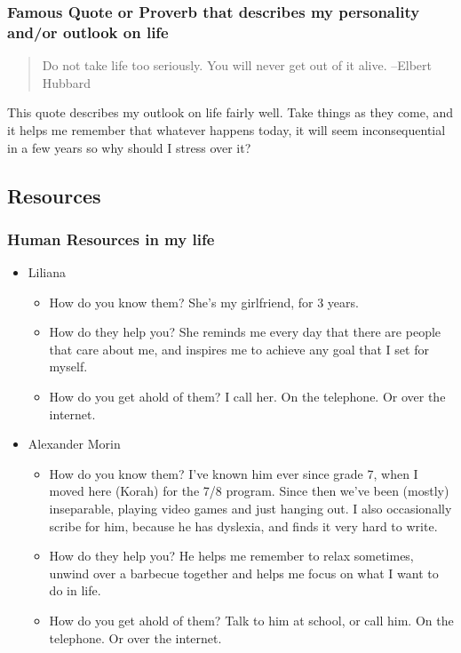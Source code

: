 \documentclass[11pt]{article}
\begin{document}
\subsubsection*{Famous Quote or Proverb that describes my personality and/or outlook on life}
\label{sec:org5235c1a}
\begin{quote}
Do not take life too seriously. You will never get out of it alive. --Elbert Hubbard
\end{quote}
This quote describes my outlook on life fairly well. Take things as they come, and it helps me remember that whatever happens today, it will seem inconsequential in a few years so why should I stress over it?
\subsection*{Resources}
\label{sec:org646a368}
\subsubsection*{Human Resources in my life}
\label{sec:org1f25e0e}
\begin{itemize}
\item Liliana
\label{sec:org3214a1a}
\begin{itemize}
\item How do you know them?
\label{sec:org307dc32}
She's my girlfriend, for 3 years.
\item How do they help you?
\label{sec:org05a9ec2}
She reminds me every day that there are people that care about me, and inspires me to achieve any goal that I set for myself.
\item How do you get ahold of them?
\label{sec:orge63df8a}
I call her. On the telephone. Or over the internet.
\end{itemize}
\item Alexander Morin
\label{sec:org6d8bdca}
\begin{itemize}
\item How do you know them?
\label{sec:org7ad8f51}
I've known him ever since grade 7, when I moved here (Korah) for the 7/8 program. Since then we've been (mostly) inseparable, playing video games and just hanging out. I also occasionally scribe for him, because he has dyslexia, and finds it very hard to write.
\item How do they help you?
\label{sec:orgd29d330}
He helps me remember to relax sometimes, unwind over a barbecue together and helps me focus on what I want to do in life.
\item How do you get ahold of them?
\label{sec:org43f61fb}
Talk to him at school, or call him. On the telephone. Or over the internet.
\end{itemize}
\end{itemize}
\end{document}

